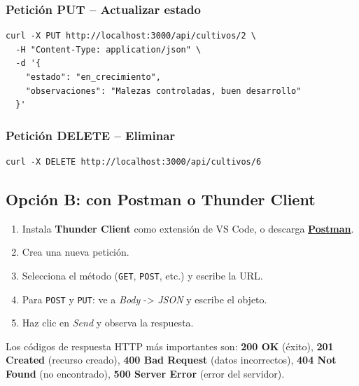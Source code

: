 \documentclass[12pt, a4paper]{article}
\begin{document}
\subsubsection{Petición PUT -- Actualizar estado}

\begin{tcolorbox}[codigoBox]
\begin{lstlisting}[style=bashStyle]
curl -X PUT http://localhost:3000/api/cultivos/2 \
  -H "Content-Type: application/json" \
  -d '{
    "estado": "en_crecimiento",
    "observaciones": "Malezas controladas, buen desarrollo"
  }'
\end{lstlisting}
\end{tcolorbox}

\subsubsection{Petición DELETE -- Eliminar}

\begin{tcolorbox}[codigoBox]
\begin{lstlisting}[style=bashStyle]
curl -X DELETE http://localhost:3000/api/cultivos/6
\end{lstlisting}
\end{tcolorbox}

\subsection{Opción B: con Postman o Thunder Client}

\begin{enumerate}[leftmargin=*, label=\textbf{\arabic*.}]
  \item Instala \textbf{Thunder Client} como extensión de VS Code, o descarga \href{https://www.postman.com}{\textbf{Postman}}.
  \item Crea una nueva petición.
  \item Selecciona el método (\texttt{GET}, \texttt{POST}, etc.) y escribe la URL.
  \item Para \texttt{POST} y \texttt{PUT}: ve a \textit{Body} -> \textit{JSON} y escribe el objeto.
  \item Haz clic en \textit{Send} y observa la respuesta.
\end{enumerate}

\begin{tcolorbox}[notaStyle]
  Los códigos de respuesta HTTP más importantes son: \textbf{200 OK} (éxito), \textbf{201 Created} (recurso creado), \textbf{400 Bad Request} (datos incorrectos), \textbf{404 Not Found} (no encontrado), \textbf{500 Server Error} (error del servidor).
\end{tcolorbox}
\end{document}
